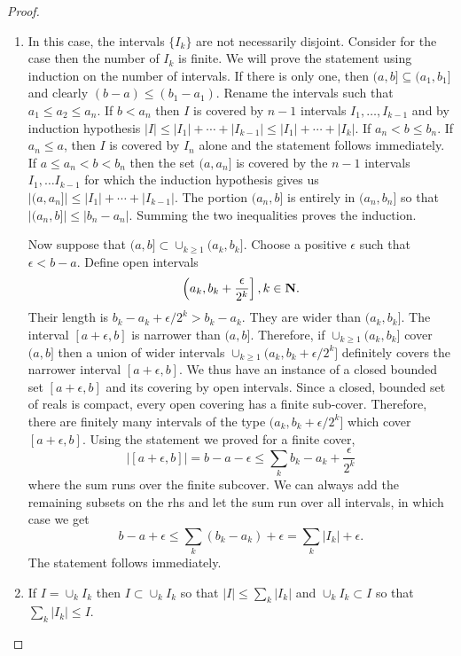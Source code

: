 \begin{itemize}
\begin{proof}
\begin{enumerate}
\item In this case, the intervals $\{I_k\}$ are not necessarily disjoint. 
Consider for the case then the number of $I_k$ is finite. We will prove the 
statement using induction on the number of intervals. If there is only one,
then $(a, b] \subseteq (a_1, b_1]$ and clearly $(b - a) \le (b_1 - a_1)$. 
Rename the intervals such that $a_1 \le a_2 \le a_n$. If $b < a_n$ then $I$ is
covered by $n - 1$ intervals $I_1, \ldots, I_{k-1}$ and by induction hypothesis
$|I| \le |I_1| + \cdots + |I_{k-1}| \le |I_1| + \cdots + |I_k|$. If $a_n < b \le
b_n$. If $a_n \le a$, then $I$ is covered by $I_n$ alone and the statement
follows immediately. If $a \le a_n < b < b_n$ then the set $(a, a_n]$ is 
covered by the $n - 1$ intervals $I_1, \ldots I_{k-1}$ for which the induction
hypothesis gives us $|(a, a_n]| \le |I_1| + \cdots + |I_{k-1}|$. The portion
$(a_n, b]$ is entirely in $(a_n, b_n]$ so that $|(a_n, b]| \le |b_n - a_n|$.
Summing the two inequalities proves the induction.

Now suppose that $(a, b] \subset \cup_{k \ge 1}(a_k, b_k]$. Choose a positive
$\epsilon$ such that $\epsilon < b - a$. Define open intervals
\[
\left(a_k, b_k + \frac{\epsilon}{2^k}\right], k \in \mathbf{N}.
\]
Their length is $b_k - a_k + \epsilon/2^k > b_k - a_k$. They are wider than
$(a_k, b_k]$. The interval $[a + \epsilon, b]$ is narrower than $(a, b]$.
Therefore, if $\cup_{k \ge 1}(a_k, b_k]$ cover $(a, b]$ then a union of wider
intervals $\cup_{k \ge 1}(a_k, b_k + \epsilon/2^k]$ definitely covers the 
narrower interval $[a + \epsilon, b]$. We thus have an instance of a closed
bounded set $[a + \epsilon, b]$ and its covering by open intervals. Since a 
closed, bounded set of reals is compact, every open covering has a finite 
sub-cover. Therefore, there are finitely many intervals of the type $(a_k,
b_k + \epsilon/2^k]$ which cover $[a + \epsilon, b]$. Using the statement
we proved for a finite cover,
\[
|[a+\epsilon, b]| = b - a - \epsilon \le \sum_k b_k - a_k + \frac{\epsilon}{2^k}
\]
where the sum runs over the finite subcover. We can always add the remaining
subsets on the rhs and let the sum run over all intervals, in which case we
get
\[
b - a + \epsilon \le \sum_k(b_k - a_k) + \epsilon = \sum_k |I_k| + \epsilon.
\]
The statement follows immediately.

\item If $I = \cup_k I_k$ then $I \subset \cup_k I_k$ so that $|I| \le \sum_k
|I_k|$ and $\cup_k I_k \subset I$ so that $\sum_k |I_k| \le I$.
\end{enumerate}
\end{proof}



\end{itemize}
